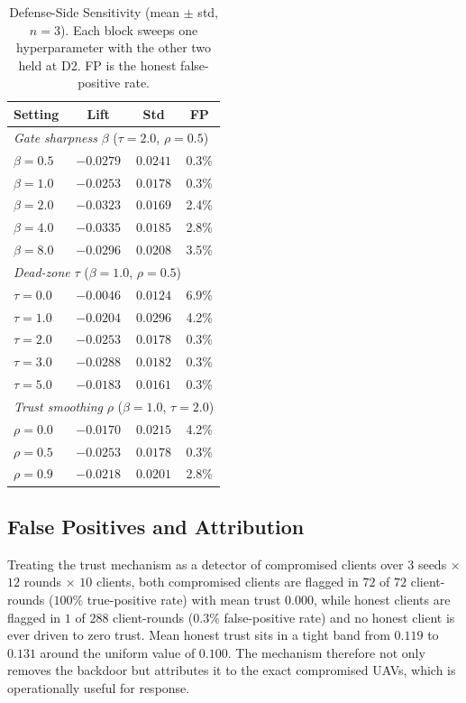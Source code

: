 \documentclass[journal]{IEEEtran}
\begin{document}
\begin{table}[!t]
\renewcommand{\arraystretch}{1.2}
\caption{Defense-Side Sensitivity (mean $\pm$ std, $n=3$). Each block sweeps one hyperparameter with the other two held at D2. FP is the honest false-positive rate.}
\label{tab:sensitivity}
\centering
\footnotesize
\setlength{\tabcolsep}{5pt}
\begin{tabular}{lccc}
\toprule
\textbf{Setting} & \textbf{Lift} & \textbf{Std} & \textbf{FP} \\
\midrule
\multicolumn{4}{l}{\textit{Gate sharpness} $\beta$ ($\tau=2.0$, $\rho=0.5$)} \\
$\beta = 0.5$ & $-0.0279$ & $0.0241$ & 0.3\% \\
$\beta = 1.0$ & $-0.0253$ & $0.0178$ & 0.3\% \\
$\beta = 2.0$ & $-0.0323$ & $0.0169$ & 2.4\% \\
$\beta = 4.0$ & $-0.0335$ & $0.0185$ & 2.8\% \\
$\beta = 8.0$ & $-0.0296$ & $0.0208$ & 3.5\% \\
\midrule
\multicolumn{4}{l}{\textit{Dead-zone} $\tau$ ($\beta=1.0$, $\rho=0.5$)} \\
$\tau = 0.0$ & $-0.0046$ & $0.0124$ & 6.9\% \\
$\tau = 1.0$ & $-0.0204$ & $0.0296$ & 4.2\% \\
$\tau = 2.0$ & $-0.0253$ & $0.0178$ & 0.3\% \\
$\tau = 3.0$ & $-0.0288$ & $0.0182$ & 0.3\% \\
$\tau = 5.0$ & $-0.0183$ & $0.0161$ & 0.3\% \\
\midrule
\multicolumn{4}{l}{\textit{Trust smoothing} $\rho$ ($\beta=1.0$, $\tau=2.0$)} \\
$\rho = 0.0$ & $-0.0170$ & $0.0215$ & 4.2\% \\
$\rho = 0.5$ & $-0.0253$ & $0.0178$ & 0.3\% \\
$\rho = 0.9$ & $-0.0218$ & $0.0201$ & 2.8\% \\
\bottomrule
\end{tabular}
\end{table}

\subsection{False Positives and Attribution}
\label{subsec:fp}
Treating the trust mechanism as a detector of compromised clients over $3$ seeds $\times$ $12$ rounds $\times$ $10$ clients, both compromised clients are flagged in $72$ of $72$ client-rounds ($100\%$ true-positive rate) with mean trust $0.000$, while honest clients are flagged in $1$ of $288$ client-rounds ($0.3\%$ false-positive rate) and no honest client is ever driven to zero trust. Mean honest trust sits in a tight band from $0.119$ to $0.131$ around the uniform value of $0.100$. The mechanism therefore not only removes the backdoor but attributes it to the exact compromised UAVs, which is operationally useful for response.
\end{document}
